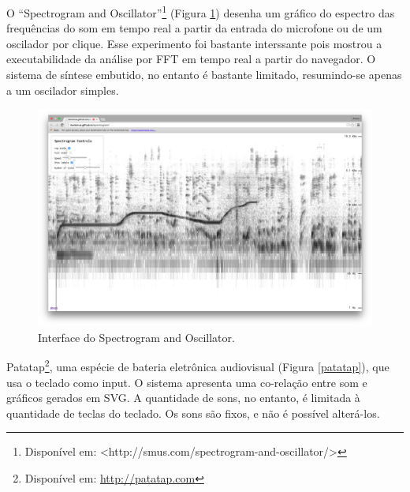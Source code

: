O ``Spectrogram and Oscillator''\footnote{Disponível em: <http://smus.com/spectrogram-and-oscillator/>} (Figura \ref{spectrogramosc}) desenha um gráfico do espectro das frequências do som em tempo real a partir da entrada do microfone ou de um oscilador por clique. Esse experimento foi bastante interssante pois mostrou a executabilidade da análise por FFT em tempo real a partir do navegador. O sistema de síntese embutido, no entanto é bastante limitado, resumindo-se apenas a um oscilador simples.   



\begin{figure}
    \caption{\label{spectrogramosc}Interface do Spectrogram and Oscillator.}
    
        \includegraphics[width=1\linewidth]{pictures/cap2/spectrogramandoscilator}
    
\end{figure}

Patatap\footnote{Disponível em: \url{http://patatap.com}}, uma espécie de bateria eletrônica audiovisual (Figura \ref{patatap}), que usa o teclado como input. O sistema apresenta uma co-relação entre som e gráficos gerados em SVG. A quantidade de sons, no entanto, é limitada à quantidade de teclas do teclado. Os sons são fixos, e não é possível alterá-los.

